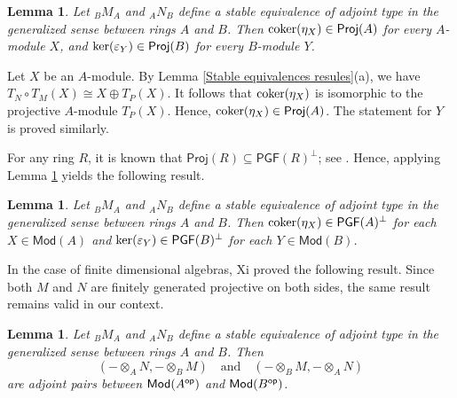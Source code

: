 \documentclass[12pt,twoside]{amsart}
\theoremstyle{bfupright head,slanted body}
\theoremstyle{bfupright head,upright body}
\theoremstyle{fixed bf head,slanted body}
\newtheorem{lem}[res]{Lemma}            \newtheorem*{lem*}{Lemma}
\theoremstyle{fixed bf head,upright body}
\theoremstyle{numbered paragraph}
\newenvironment{prf*}[1][Proof]{%
  \begin{proof}[\bf #1]
    \setcounter{equation}{0}
    \renewcommand{\theequation}{\arabic{equation}}}
  {\end{proof}
}
\newcommand{\lemcite}[2][?]{\cite[Lemma~#1]{#2}}
\numberwithin{equation}{res}
\newcommand{\PGF}{\mathsf{PGF}}
\newcommand{\Proj}{\mathsf{Proj}}
\newcommand{\Mod}{\mathsf{Mod}}
\newcommand{\op}{\sf op}
\newcommand{\cok}{\mbox{\rm coker}}
\newcommand{\kernel}{\mbox{\rm ker}}
\begin{document}
\begin{lem} \label{conditions}
Let $_BM_A$ and $_AN_B$ define a stable equivalence of adjoint type in the generalized sense between rings $A$ and $B$.
Then $\cok(\eta_X) \in \Proj(A)$ for every $A$-module $X$, and $\kernel(\varepsilon_Y) \in \Proj(B)$ for every $B$-module $Y$.
\end{lem}

\begin{prf*}
Let $X$ be an $A$-module.
By Lemma \ref{Stable equivalences resules}(a), we have $T_N\circ T_M(X) \cong X \oplus T_P(X)$.
It follows that $\cok(\eta_X)$ is isomorphic to the projective $A$-module $T_P(X)$.
Hence, $\cok(\eta_X) \in \Proj(A)$. The statement for $Y$ is proved similarly.
\end{prf*}

For any ring \(R\), it is known that $\Proj(R) \subseteq \PGF(R)^\bot$; see \cite[Theorem 4.11]{2020Sto}.
Hence, applying Lemma \ref{conditions} yields the following result.

\begin{lem} \label{condition of adjoint type}
Let $_BM_A$ and $_AN_B$ define a stable equivalence of adjoint type in the generalized sense between rings $A$ and $B$.
Then $\cok(\eta_X) \in \PGF(A)^\bot$ for each $X \in \Mod(A)$ and $\kernel(\varepsilon_Y) \in \PGF(B)^\bot$ for each $Y \in \Mod(B)$.
\end{lem}

In the case of finite dimensional algebras, Xi \lemcite[3.3]{2008Xi} proved the following result.
Since both $M$ and $N$ are finitely generated projective on both sides, the same result remains valid in our context.

\begin{lem} \label{op adjoint pair}
Let $_BM_A$ and $_AN_B$ define a stable equivalence of adjoint type in the generalized sense between rings $A$ and $B$.
Then
\[
(- \otimes_A N, - \otimes_B M) \quad\text{and}\quad (- \otimes_B M, - \otimes_A N)
\]
are adjoint pairs between $\Mod(A^{\op})$ and $\Mod(B^{\op})$.
\end{lem}
\end{document}
